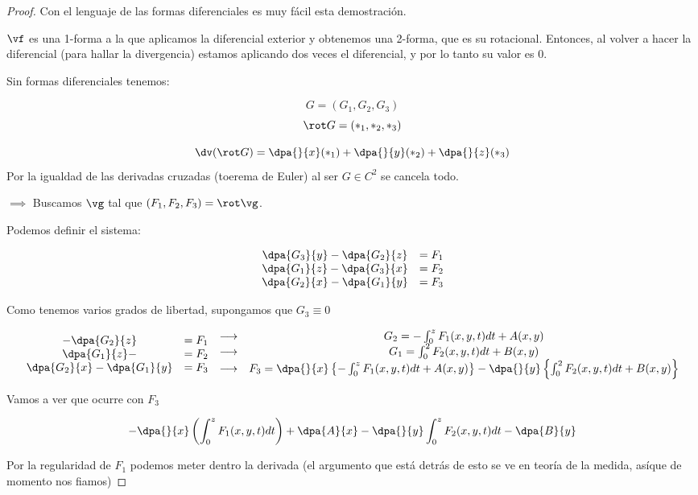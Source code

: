 \begin{proof}

Con el lenguaje de las formas diferenciales es muy fácil esta demostración.

$\vf$ es una 1-forma a la que aplicamos la diferencial exterior y obtenemos una 2-forma, que es su rotacional. Entonces, al volver a hacer la diferencial (para hallar la divergencia) estamos aplicando dos veces el diferencial, y por lo tanto su valor es 0.

Sin formas diferenciales tenemos:

\[G=(G_1,G_2,G_3)\]
\[\rot G = \left(\ast_1,\ast_2,\ast_3\right)\]

\[\dv(\rot G) = \dpa{}{x}(\ast_1) + \dpa{}{y}(\ast_2) + \dpa{}{z}(\ast_3)\]
Por la igualdad de las derivadas cruzadas (toerema de Euler) al ser $G\in C^2$ se cancela todo.

$\implies$ Buscamos $\vg$ tal que $(F_1,F_2,F_3) = \rot \vg$.

Podemos definir el sistema:

\[\begin{array}{cc}
\dpa{G_3}{y} - \dpa{G_2}{z} &= F_1\\
\dpa{G_1}{z} - \dpa{G_3}{x} &= F_2\\
\dpa{G_2}{x} - \dpa{G_1}{y} &= F_3
\end{array}\]

Como tenemos varios grados de libertad, supongamos que $G_3\equiv 0$

\[\begin{array}{cc}
 - \dpa{G_2}{z} &= F_1\\
\dpa{G_1}{z} - &= F_2\\
\dpa{G_2}{x} - \dpa{G_1}{y} &= F_3
\end{array} \begin{array}{cc}
\longrightarrow & G_2 = -\int_0^z F_1(x,y,t)dt+A(x,y)\\
\longrightarrow & G_1 = \int_0^2 F_2(x,y,t)dt + B(x,y)\\
\longrightarrow & F_3 = \dpa{}{x} \left\{-\int_0^z F_1(x,y,t)dt + A(x,y)\right\}
- \dpa{}{y}\left\{\int_0^2 F_2(x,y,t)dt + B(x,y) \right\}
\end{array}
\]

Vamos a ver que ocurre con  $F_3$

\[-\dpa{}{x}\left(\int_0^z F_1(x,y,t)dt\right) + \dpa{A}{x} - \dpa{}{y}\int_0^z F_2(x,y,t)dt - \dpa{B}{y}\]

Por la regularidad de $F_1$ podemos meter dentro la derivada (el argumento que está detrás de esto se ve en teoría de la medida, asíque de momento nos fiamos)


\end{proof}
